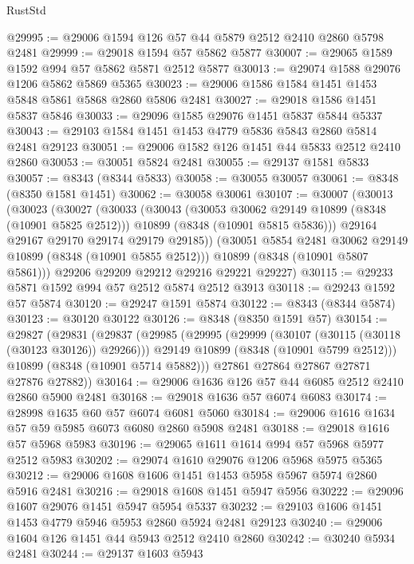 \begin{lexlean}{RustStd}
\begin{coremodule}
@29995 := @29006 @1594 @126 @57 @44 @5879 @2512 @2410 @2860 @5798 @2481
@29999 := @29018 @1594 @57 @5862 @5877
@30007 := @29065 @1589 @1592 @994 @57 @5862 @5871 @2512 @5877
@30013 := @29074 @1588 @29076 @1206 @5862 @5869 @5365
@30023 := @29006 @1586 @1584 @1451 @1453 @5848 @5861 @5868 @2860 @5806 @2481
@30027 := @29018 @1586 @1451 @5837 @5846
@30033 := @29096 @1585 @29076 @1451 @5837 @5844 @5337
@30043 := @29103 @1584 @1451 @1453 @4779 @5836 @5843 @2860 @5814 @2481 @29123
@30051 := @29006 @1582 @126 @1451 @44 @5833 @2512 @2410 @2860
@30053 := @30051 @5824 @2481
@30055 := @29137 @1581 @5833
@30057 := @8343 (@8344 @5833)
@30058 := @30055 @30057
@30061 := @8348 (@8350 @1581 @1451)
@30062 := @30058 @30061
@30107 := @30007
    (@30013
      (@30023
        (@30027
          (@30033
            (@30043
              (@30053 @30062 @29149 @10899 (@8348 (@10901 @5825 @2512)))
              @10899
              (@8348 (@10901 @5815 @5836)))
            @29164
            @29167
            @29170
            @29174
            @29179
            @29185))
        (@30051 @5854 @2481 @30062 @29149 @10899 (@8348 (@10901 @5855 @2512)))
        @10899
        (@8348 (@10901 @5807 @5861)))
      @29206
      @29209
      @29212
      @29216
      @29221
      @29227)
@30115 := @29233 @5871 @1592 @994 @57 @2512 @5874 @2512 @3913
@30118 := @29243 @1592 @57 @5874
@30120 := @29247 @1591 @5874
@30122 := @8343 (@8344 @5874)
@30123 := @30120 @30122
@30126 := @8348 (@8350 @1591 @57)
@30154 := @29827
    (@29831
      (@29837
        (@29985
          (@29995
            (@29999 (@30107 (@30115 (@30118 (@30123 @30126)) @29266)))
            @29149
            @10899
            (@8348 (@10901 @5799 @2512)))
          @10899
          (@8348 (@10901 @5714 @5882)))
        @27861
        @27864
        @27867
        @27871
        @27876
        @27882))
@30164 := @29006 @1636 @126 @57 @44 @6085 @2512 @2410 @2860 @5900 @2481
@30168 := @29018 @1636 @57 @6074 @6083
@30174 := @28998 @1635 @60 @57 @6074 @6081 @5060
@30184 := @29006 @1616 @1634 @57 @59 @5985 @6073 @6080 @2860 @5908 @2481
@30188 := @29018 @1616 @57 @5968 @5983
@30196 := @29065 @1611 @1614 @994 @57 @5968 @5977 @2512 @5983
@30202 := @29074 @1610 @29076 @1206 @5968 @5975 @5365
@30212 := @29006 @1608 @1606 @1451 @1453 @5958 @5967 @5974 @2860 @5916 @2481
@30216 := @29018 @1608 @1451 @5947 @5956
@30222 := @29096 @1607 @29076 @1451 @5947 @5954 @5337
@30232 := @29103 @1606 @1451 @1453 @4779 @5946 @5953 @2860 @5924 @2481 @29123
@30240 := @29006 @1604 @126 @1451 @44 @5943 @2512 @2410 @2860
@30242 := @30240 @5934 @2481
@30244 := @29137 @1603 @5943

\end{coremodule}
\end{lexlean}
